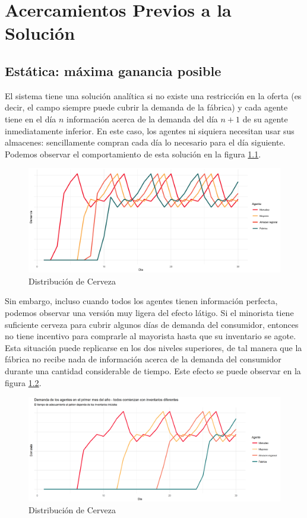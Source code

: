 \chapter{Acercamientos Previos a la Soluci\'on}

\section{Est\'atica: m\'axima ganancia posible}

El sistema tiene una soluci\'on anal\'itica si no existe una restricci\'on en la oferta (es decir, el campo siempre puede cubrir la demanda de la f\'abrica) y cada agente tiene en el d\'ia $n$ informaci\'on acerca de la demanda del d\'ia $n+1$ de su agente inmediatamente inferior. En este caso, los agentes ni siquiera necesitan usar sus almacenes: sencillamente compran cada d\'ia lo necesario para el d\'ia siguiente. Podemos observar el comportamiento de esta soluci\'on en la figura \ref{analytic_1}.

\begin{figure}[ht!]
\caption{Distribuci\'on de Cerveza}
\label{analytic_1}
\includegraphics[width=12cm]{tesis_tex/figs/analytic_solution_0_all_0_inv.png}
\centering
\end{figure}

Sin embargo, incluso cuando todos los agentes tienen informaci\'on perfecta, podemos observar una versi\'on muy ligera del efecto l\'atigo. Si el minorista tiene suficiente cerveza para cubrir algunos d\'ias de demanda del consumidor, entonces no tiene incentivo para comprarle al mayorista hasta que su inventario se agote. Esta situaci\'on puede replicarse en los dos niveles superiores, de tal manera que la f\'abrica no recibe nada de informaci\'on acerca de la demanda del consumidor durante una cantidad considerable de tiempo. Este efecto se puede observar en la figura \ref{analytic_2}.

\begin{figure}[ht!]
\caption{Distribuci\'on de Cerveza}
\label{analytic_2}
\includegraphics[width=12cm]{tesis_tex/figs/analytic_solution_0_all_45_inv.png}
\centering
\end{figure}

